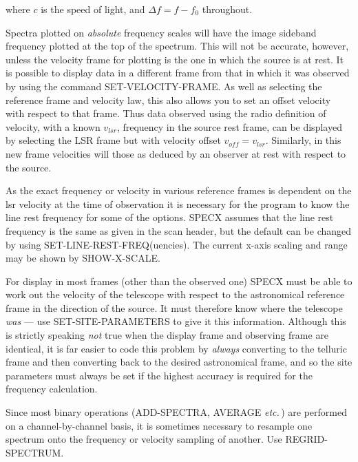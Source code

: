 \documentclass[11pt,twoside]{report}
\newcommand{\etc}{{\it etc.\,}}
\begin{document}
where $c$ is the speed of light, and $\Delta f = f-f_0$ throughout.

Spectra plotted on {\em absolute} frequency scales will have the image sideband
frequency plotted at the top of the spectrum. 
This will not be accurate, however, unless the velocity frame for plotting is
the one in which the source is at rest. It is possible to display data in a
different frame from that in which it was observed by using the command
SET-VELOCITY-FRAME. As well as selecting the
reference frame and velocity law, this also allows you to set an offset
velocity with respect to that frame. Thus data observed using the radio
definition of velocity, with a known $v_{lsr}$, frequency in the source rest
frame, can be displayed by selecting the LSR frame but with velocity offset
$v_{off}=v_{lsr}$. Similarly, in this new frame velocities will those as
deduced by an observer at rest with respect to the source.

As the exact frequency or velocity in various reference frames is dependent on
the lsr velocity at the time of observation it is necessary for the program to
know the line rest frequency for some of the options. SPECX assumes that the
line rest frequency is the same as given in the scan header, but
the default can be changed by using SET-LINE-REST-FREQ(uencies). The current
x-axis scaling and range may be shown by SHOW-X-SCALE.

For display in most frames (other than the observed one) SPECX must be able to
work out the velocity of the telescope with respect to the astronomical
reference frame  in the direction of the
source. It must therefore know where the telescope  {\em was}
--- use SET-SITE-PARAMETERS to give it this information. Although this is
strictly speaking {\em not} true when the display frame and observing frame
are identical, it is far easier to code this problem by {\em always} converting
to the telluric frame and then converting back to the desired astronomical frame,
and so the site parameters must always be set if the highest accuracy is
required for the frequency calculation.

Since most binary operations (ADD-SPECTRA, AVERAGE \etc) are performed on a
 channel-by-channel
basis, it is sometimes necessary to resample one spectrum  onto the frequency or velocity sampling of
another. Use REGRID-SPECTRUM.
\end{document}
